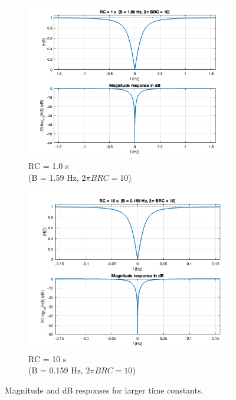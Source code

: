 \documentclass[11pt]{article}
\begin{document}
\begin{figure}[H]
    \centering
    \begin{subfigure}{0.48\textwidth}
        \centering
        \includegraphics[width=\textwidth]{RC_image3.png}
        \caption{RC = 1.0 s \\ (B = 1.59 Hz, \(2\pi BRC = 10\))}
    \end{subfigure}
    \hfill
    \begin{subfigure}{0.48\textwidth}
        \centering
        \includegraphics[width=\textwidth]{RC_image4.png}
        \caption{RC = 10 s \\ (B = 0.159 Hz, \(2\pi BRC = 10\))}
    \end{subfigure}
    \caption{Magnitude and dB responses for larger time constants.}
\end{figure}
\end{document}
